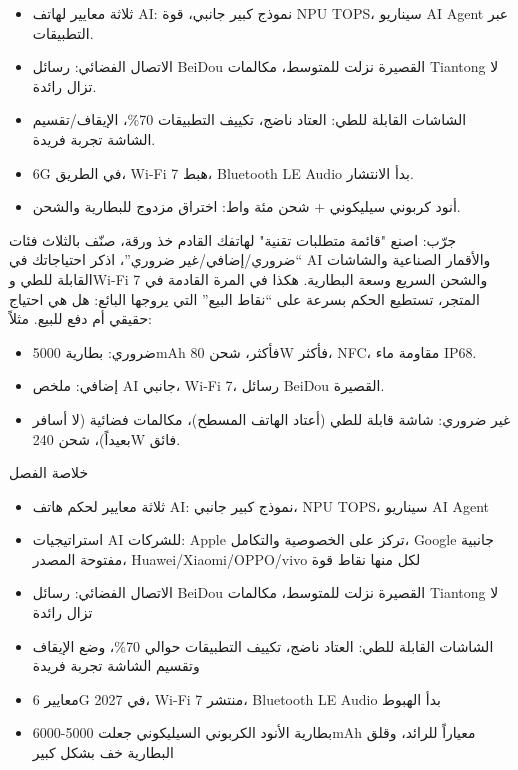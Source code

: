 
\begin{itemize}
  \item ثلاثة معايير لهاتف AI: نموذج كبير جانبي، قوة NPU TOPS، سيناريو AI Agent عبر التطبيقات.
  \item الاتصال الفضائي: رسائل BeiDou القصيرة نزلت للمتوسط، مكالمات Tiantong لا تزال رائدة.
  \item الشاشات القابلة للطي: العتاد ناضج، تكييف التطبيقات 70\%، الإيقاف/تقسيم الشاشة تجربة فريدة.
  \item 6G في الطريق، Wi-Fi 7 هبط، Bluetooth LE Audio بدأ الانتشار.
  \item أنود كربوني سيليكوني + شحن مئة واط: اختراق مزدوج للبطارية والشحن.
\end{itemize}

\begin{tcbpractice}{جرّب: اصنع "قائمة متطلبات تقنية" لهاتفك القادم}
خذ ورقة، صنّف بالثلاث فئات “ضروري/إضافي/غير ضروري”، اذكر احتياجاتك في AI والأقمار الصناعية والشاشات القابلة للطي وWi-Fi 7 والشحن السريع وسعة البطارية. هكذا في المرة القادمة في المتجر، تستطيع الحكم بسرعة على “نقاط البيع” التي يروجها البائع: هل هي احتياج حقيقي أم دفع للبيع. مثلاً:

\begin{itemize}
  \item ضروري: بطارية 5000mAh فأكثر، شحن 80W فأكثر، NFC، مقاومة ماء IP68.
  \item إضافي: ملخص AI جانبي، Wi-Fi 7، رسائل BeiDou القصيرة.
  \item غير ضروري: شاشة قابلة للطي (أعتاد الهاتف المسطح)، مكالمات فضائية (لا أسافر بعيداً)، شحن 240W فائق.
\end{itemize}

\end{tcbpractice}

\begin{tcbsummary}{خلاصة الفصل}
\begin{itemize}
  \item ثلاثة معايير لحكم هاتف AI: نموذج كبير جانبي، NPU TOPS، سيناريو AI Agent
  \item استراتيجيات AI للشركات: Apple تركز على الخصوصية والتكامل، Google جانبية مفتوحة المصدر، Huawei/Xiaomi/OPPO/vivo لكل منها نقاط قوة
  \item الاتصال الفضائي: رسائل BeiDou القصيرة نزلت للمتوسط، مكالمات Tiantong لا تزال رائدة
  \item الشاشات القابلة للطي: العتاد ناضج، تكييف التطبيقات حوالي 70\%، وضع الإيقاف وتقسيم الشاشة تجربة فريدة
  \item معايير 6G في 2027، Wi-Fi 7 منتشر، Bluetooth LE Audio بدأ الهبوط
  \item بطارية الأنود الكربوني السيليكوني جعلت 5000-6000mAh معياراً للرائد، وقلق البطارية خف بشكل كبير
\end{itemize}

\end{tcbsummary}
